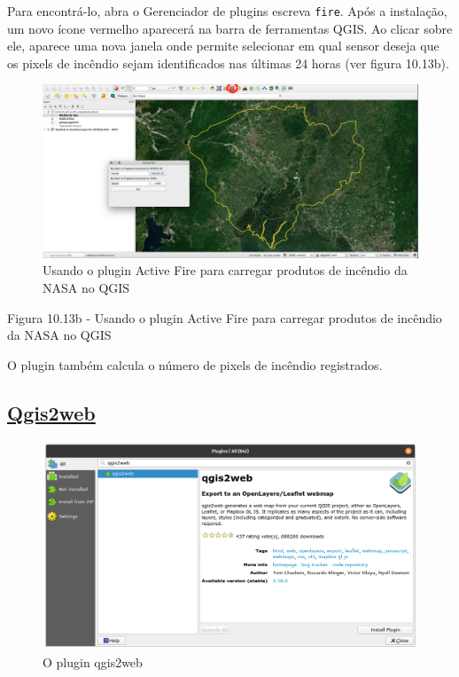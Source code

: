 \documentclass[
]{krantz}
\begin{document}
Para encontrá-lo, abra o Gerenciador de plugins escreva \texttt{fire}. Após a instalação, um novo ícone vermelho aparecerá na barra de ferramentas QGIS. Ao clicar sobre ele, aparece uma nova janela onde permite selecionar em qual sensor deseja que os pixels de incêndio sejam identificados nas últimas 24 horas (ver figura 10.13b).

\begin{figure}
\centering
\includegraphics{media/modulo10/fig1013_b.png}
\caption{Usando o plugin Active Fire para carregar produtos de incêndio da NASA no QGIS}
\end{figure}

Figura 10.13b - Usando o plugin Active Fire para carregar produtos de incêndio da NASA no QGIS

O plugin também calcula o número de pixels de incêndio registrados.

\hypertarget{qgis2web}{%
\subsection{\texorpdfstring{\href{https://github.com/tomchadwin/qgis2web}{Qgis2web}}{Qgis2web}}\label{qgis2web}}

\begin{figure}
\centering
\includegraphics{media/modulo10/fig1014_a.png}
\caption{O plugin qgis2web}
\end{figure}
\end{document}
